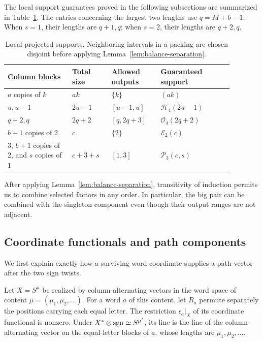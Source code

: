 The local support guarantees proved in the following subsections are
summarized in Table~\ref{bal:local-table}. The entries concerning the largest
two lengths use $q=M+b-1$.  When $s=1$, their lengths are $q+1,q$;
when $s=2$, their lengths are $q+2,q$.

\begin{table}[htbp]
\centering
\small
\renewcommand{\arraystretch}{1.25}
\begin{tabular}{@{}p{0.25\linewidth}p{0.15\linewidth}p{0.19\linewidth}p{0.29\linewidth}@{}}
\hline
Column blocks & Total size & Allowed outputs
    & Guaranteed support\\
\hline
$a$ copies of $k$ & $ak$ & $\{k\}$ & $(ak)$\\
$u,u-1$ & $2u-1$ & $[u-1,u]$ & $\mathcal H_4(2u-1)$\\
$q+2,q$ & $2q+2$ & $[q,2q+3]$ & $\mathcal O_4(2q+2)$\\
$b+1$ copies of $2$ & $c$ & $\{2\}$ & $\mathcal E_2(c)$\\
$3$, $b+1$ copies of $2$, and $s$ copies of $1$
    & $c+3+s$ & $[1,3]$ & $\mathcal P_3(c,s)$\\
\hline
\end{tabular}
\caption{Local projected supports.  Neighboring intervals in a
packing are chosen disjoint before applying
Lemma~\ref{lem:balance-separation}.}
\label{bal:local-table}
\end{table}

After applying Lemma~\ref{lem:balance-separation}, transitivity
of induction permits us to combine selected factors in any order.
In particular, the big pair can be combined with the singleton
component even though their output ranges are not adjacent.

\subsection{Coordinate functionals and path components}

We first explain exactly how a surviving word coordinate supplies
a path vector after the two sign twists.

\begin{lemma}
\label{bal:coordinate-line}
Let $X=S^\mu$ be realized by column-alternating vectors in the word
space of content $\mu=(\mu_1,\mu_2,\ldots)$.  For a word $a$ of
this content, let $R_a$ permute separately the positions carrying
each equal letter.  The restriction $\epsilon_a|_X$ of its
coordinate functional is nonzero.  Under
$X^*\otimes\operatorname{sgn}\simeq S^{\mu^t}$, its line is the
line of the column-alternating vector on the equal-letter blocks
of $a$, whose lengths are $\mu_1,\mu_2,\ldots$.
\end{lemma}

